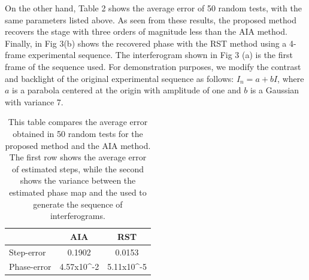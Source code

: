 \documentclass[letterpaper,12pt]{article}   %
\begin{document}
On the other hand, Table 2 shows the average error of 50 random tests, with the same 
parameters listed above. As seen from these results, the proposed method recovers the
stage with three orders of magnitude less than the AIA method.
Finally, in Fig 3(b) shows the recovered phase with the RST method using a 4-frame
experimental sequence. The interferogram shown in Fig 3 (a) is the first frame of the 
sequence used. For demonstration purposes, we modify the contrast and backlight of the 
original experimental sequence as follows: $I_n=a+bI$, where $a$ is a parabola centered 
at the origin with amplitude of one and $b$ is a Gaussian with variance 7.
\begin{table}
	\begin{center}
		\begin{tabular}{|l|c|c|}
		\hline
		            & AIA    & RST 	    \\ \hline \hline
		Step-error  & 0.1902 & 0.0153	\\ \hline
		Phase-error & 4.57x10^{-2} & 5.11x10^{-5} \\ \hline
		\end{tabular}
	\end{center}
	\caption{This table compares the average error obtained in 50 random tests for the
	proposed method and the AIA method. The first row shows the average error of
	estimated steps, while the second shows the variance between the estimated phase map
	and the used to generate the sequence of interferograms.} 
	\label{Tab:mean-phase_error}
\end{table}
\end{document}
